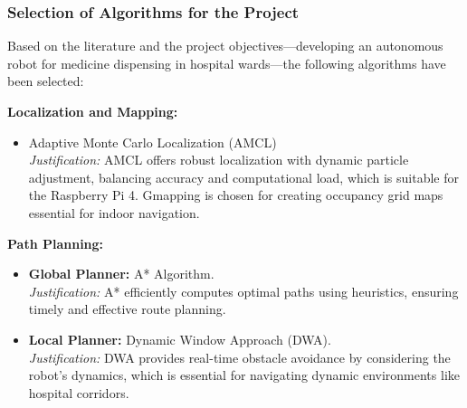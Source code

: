 \subsubsection*{Selection of Algorithms for the Project}

Based on the literature and the project objectives—developing an autonomous robot for medicine dispensing in hospital wards—the following algorithms have been selected:

\noindent\textbf{Localization and Mapping:} 
\begin{itemize}
    \item Adaptive Monte Carlo Localization (AMCL) \\
    \textit{Justification:} AMCL offers robust localization with dynamic particle adjustment, balancing accuracy and computational load, which is suitable for the Raspberry Pi 4. Gmapping is chosen for creating occupancy grid maps essential for indoor navigation.
\end{itemize}

\noindent\textbf{Path Planning:}
\begin{itemize}
    \item \textbf{Global Planner:} A* Algorithm. \\
    \textit{Justification:} A* efficiently computes optimal paths using heuristics, ensuring timely and effective route planning.
    \item \textbf{Local Planner:} Dynamic Window Approach (DWA).\\
    \textit{Justification:} DWA provides real-time obstacle avoidance by considering the robot's dynamics, which is essential for navigating dynamic environments like hospital corridors.
\end{itemize}


